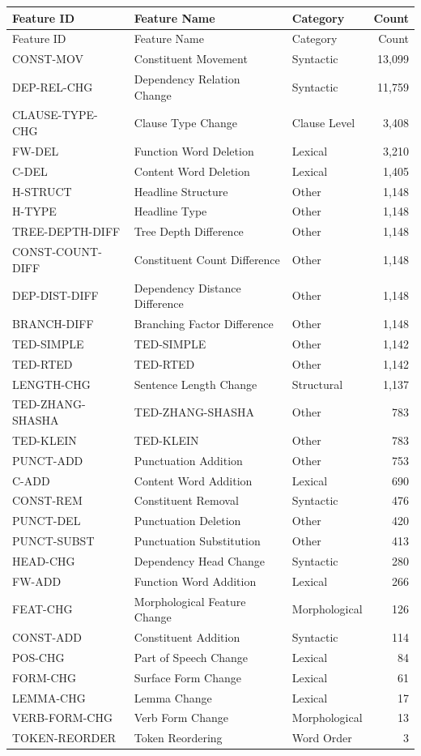 \documentclass[11pt,a4paper]{article}
\begin{document}
\begin{longtable}{lllr}
\toprule
Feature ID & Feature Name & Category & Count \\
\midrule
\endfirsthead
\toprule
Feature ID & Feature Name & Category & Count \\
\midrule
\endhead
CONST-MOV & Constituent Movement & Syntactic & 13,099 \\
DEP-REL-CHG & Dependency Relation Change & Syntactic & 11,759 \\
CLAUSE-TYPE-CHG & Clause Type Change & Clause Level & 3,408 \\
FW-DEL & Function Word Deletion & Lexical & 3,210 \\
C-DEL & Content Word Deletion & Lexical & 1,405 \\
H-STRUCT & Headline Structure & Other & 1,148 \\
H-TYPE & Headline Type & Other & 1,148 \\
TREE-DEPTH-DIFF & Tree Depth Difference & Other & 1,148 \\
CONST-COUNT-DIFF & Constituent Count Difference & Other & 1,148 \\
DEP-DIST-DIFF & Dependency Distance Difference & Other & 1,148 \\
BRANCH-DIFF & Branching Factor Difference & Other & 1,148 \\
TED-SIMPLE & TED-SIMPLE & Other & 1,142 \\
TED-RTED & TED-RTED & Other & 1,142 \\
LENGTH-CHG & Sentence Length Change & Structural & 1,137 \\
TED-ZHANG-SHASHA & TED-ZHANG-SHASHA & Other & 783 \\
TED-KLEIN & TED-KLEIN & Other & 783 \\
PUNCT-ADD & Punctuation Addition & Other & 753 \\
C-ADD & Content Word Addition & Lexical & 690 \\
CONST-REM & Constituent Removal & Syntactic & 476 \\
PUNCT-DEL & Punctuation Deletion & Other & 420 \\
PUNCT-SUBST & Punctuation Substitution & Other & 413 \\
HEAD-CHG & Dependency Head Change & Syntactic & 280 \\
FW-ADD & Function Word Addition & Lexical & 266 \\
FEAT-CHG & Morphological Feature Change & Morphological & 126 \\
CONST-ADD & Constituent Addition & Syntactic & 114 \\
POS-CHG & Part of Speech Change & Lexical & 84 \\
FORM-CHG & Surface Form Change & Lexical & 61 \\
LEMMA-CHG & Lemma Change & Lexical & 17 \\
VERB-FORM-CHG & Verb Form Change & Morphological & 13 \\
TOKEN-REORDER & Token Reordering & Word Order & 3 \\
\bottomrule
\end{longtable}
\end{document}
